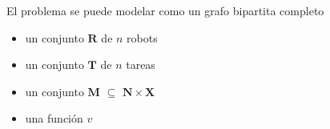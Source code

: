 \documentclass[12pt]{article}
\begin{document}
El problema se puede modelar como un grafo bipartita completo

\begin{itemize}
\item un conjunto $\mathbf{R}$ de $n$ robots
\item un conjunto $\mathbf{T}$ de $n$ tareas
\item un conjunto $\mathbf{M}$ $\subseteq$ $\mathbf{N} \times \mathbf{X}$
\item una función $v$ 
\end{itemize}


\end{document}
